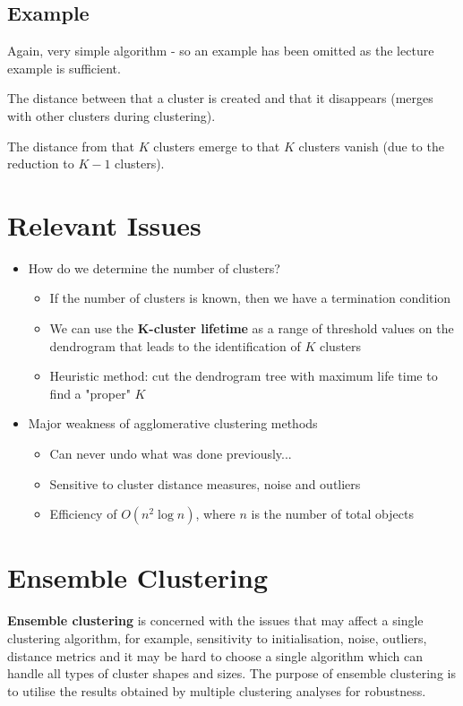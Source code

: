 \documentclass[11pt,fleqn]{book} %
\begin{document}
\subsection*{Example}
Again, very simple algorithm - so an example has been omitted as the lecture example is sufficient.\\

\begin{definition}[Lifetime]
	The distance between that a cluster is created and that it disappears (merges with other clusters during clustering).
\end{definition}

\begin{definition}
	The distance from that $K$ clusters emerge to that $K$ clusters vanish (due to the reduction to $K-1$ clusters).
\end{definition}

\section*{Relevant Issues}
\begin{itemize}
	\item How do we determine the number of clusters?
	\begin{itemize}
		\item If the number of clusters is known, then we have a termination condition
		\item We can use the \textbf{K-cluster lifetime} as a range of threshold values on the dendrogram that leads to the identification of $K$ clusters
		\item Heuristic method: cut the dendrogram tree with maximum life time to find a "proper" $K$
		\end{itemize}
	\item Major weakness of agglomerative clustering methods
	\begin{itemize}
		\item Can never undo what was done previously...
		\item Sensitive to cluster distance measures, noise and outliers
		\item Efficiency of $O(n^2\log n)$, where $n$ is the number of total objects
	\end{itemize}
\end{itemize}

\section{Ensemble Clustering}
\textbf{Ensemble clustering} is concerned with the issues that may affect a single clustering algorithm, for example, sensitivity to initialisation, noise, outliers, distance metrics and it may be hard to choose a single algorithm which can handle all types of cluster shapes and sizes. The purpose of ensemble clustering is to utilise the results obtained by multiple clustering analyses for robustness.
\end{document}
